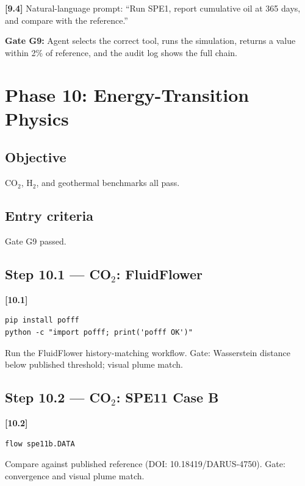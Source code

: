 \documentclass[10pt,a4paper]{article}
\newcommand{\stepID}[1]{\textsf{\textbf{[#1]}}}
\begin{document}
\stepID{9.4} Natural-language prompt: ``Run SPE1, report cumulative oil at 365 days, and compare with the reference.''

\begin{gate}
\textbf{Gate G9:} Agent selects the correct tool, runs the simulation, returns a value within 2\% of reference, and the audit log shows the full chain.
\end{gate}

\section{Phase 10: Energy-Transition Physics}
\label{sec:phase10}

\subsection{Objective}
CO$_2$, H$_2$, and geothermal benchmarks all pass.

\subsection{Entry criteria}
Gate G9 passed.

\subsection{Step 10.1 --- CO$_2$: FluidFlower}

\stepID{10.1}
\begin{lstlisting}[style=sh]
pip install pofff
python -c "import pofff; print('pofff OK')"
\end{lstlisting}

Run the FluidFlower history-matching workflow. Gate: Wasserstein distance below published threshold; visual plume match.

\subsection{Step 10.2 --- CO$_2$: SPE11 Case B}

\stepID{10.2}
\begin{lstlisting}[style=sh]
flow spe11b.DATA
\end{lstlisting}

Compare against published reference (DOI: 10.18419/DARUS-4750). Gate: convergence and visual plume match.
\end{document}
